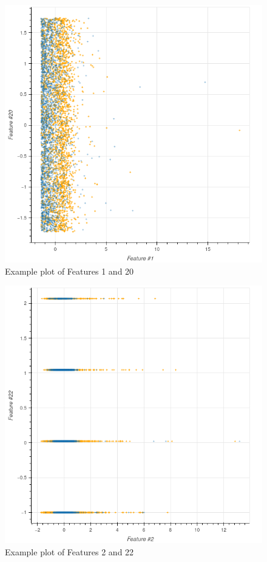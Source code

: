 \documentclass[10pt,conference,compsocconf]{IEEEtran}
\begin{document}
\begin{figure}
	\includegraphics[width=\columnwidth]{f1-f20.png}
	\caption{Example plot of Features 1 and 20}
	\label{f1-f20}
\end{figure}

\begin{figure}
	\includegraphics[width=\columnwidth]{f2-f22.png}
	\caption{Example plot of Features 2 and 22}
	\label{f2-f22}
\end{figure}



\end{document}
